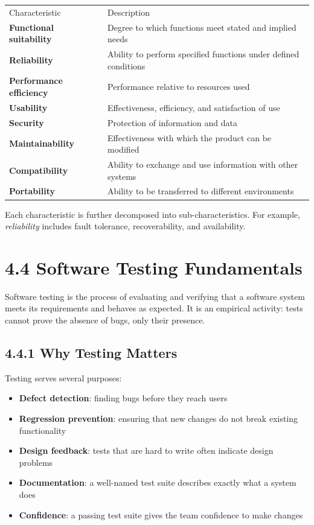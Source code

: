 \documentclass[11pt,a4paper]{book}
\begin{document}
\begin{tabular}{ll}
\hline
Characteristic & Description \\
\textbf{Functional suitability} & Degree to which functions meet stated and implied needs \\
\textbf{Reliability} & Ability to perform specified functions under defined conditions \\
\textbf{Performance efficiency} & Performance relative to resources used \\
\textbf{Usability} & Effectiveness, efficiency, and satisfaction of use \\
\textbf{Security} & Protection of information and data \\
\textbf{Maintainability} & Effectiveness with which the product can be modified \\
\textbf{Compatibility} & Ability to exchange and use information with other systems \\
\textbf{Portability} & Ability to be transferred to different environments \\
\hline
\end{tabular}

Each characteristic is further decomposed into sub-characteristics. For example, \textit{reliability} includes fault tolerance, recoverability, and availability.

\medskip

\section{4.4 Software Testing Fundamentals}

Software testing is the process of evaluating and verifying that a software system meets its requirements and behaves as expected. It is an empirical activity: tests cannot prove the absence of bugs, only their presence.

\subsection{4.4.1 Why Testing Matters}

Testing serves several purposes:

\begin{itemize}
  \item \textbf{Defect detection}: finding bugs before they reach users
  \item \textbf{Regression prevention}: ensuring that new changes do not break existing functionality
  \item \textbf{Design feedback}: tests that are hard to write often indicate design problems
  \item \textbf{Documentation}: a well-named test suite describes exactly what a system does
  \item \textbf{Confidence}: a passing test suite gives the team confidence to make changes
\end{itemize}
\end{document}
